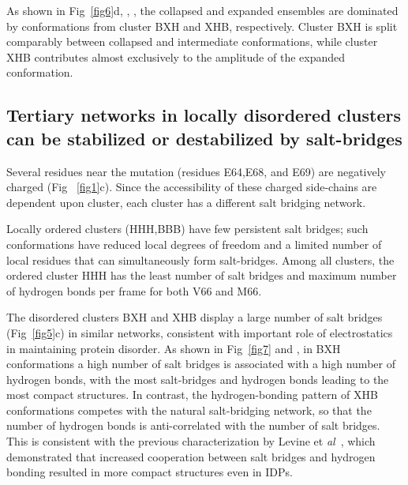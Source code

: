\documentclass[10pt,letterpaper]{article}
\begin{document}
As shown in Fig~\ref{fig6}d, , ,
the collapsed and expanded ensembles are dominated by conformations from cluster BXH and XHB, respectively.  Cluster BXH is split comparably between collapsed and intermediate conformations, while cluster XHB contributes almost exclusively to the amplitude of the expanded conformation. 





\subsection*{Tertiary networks in locally disordered clusters can be stabilized or destabilized by salt-bridges }

Several residues near the mutation (residues E64,E68, and E69) are negatively charged (Fig ~\ref{fig1}c). Since the accessibility of these charged side-chains are dependent upon cluster, each cluster has a different salt bridging network.

Locally ordered clusters (HHH,BBB) have few persistent salt bridges; such conformations have reduced local degrees of freedom and a limited number of local residues that can simultaneously form salt-bridges. Among all clusters, the ordered cluster HHH has the least number of salt bridges and maximum number of hydrogen bonds per frame for both V66 and M66. 

The disordered clusters BXH and XHB display a large number of salt bridges (Fig~\ref{fig5}c) in similar networks, consistent with important role of electrostatics in maintaining protein disorder. As shown in Fig~\ref{fig7} and , in BXH conformations a high number of salt bridges is associated with a high number of hydrogen bonds, with the most salt-bridges and hydrogen bonds leading to the most compact structures.  In contrast, the hydrogen-bonding pattern of XHB conformations competes with the natural salt-bridging network, so that the number of hydrogen bonds is anti-correlated with the number of salt bridges. This is consistent with the previous characterization by Levine et {\it al}~\cite {Levine2015,Larini2013b}, which demonstrated that increased cooperation between salt bridges and hydrogen bonding resulted in more compact structures even in IDPs. 
\end{document}
